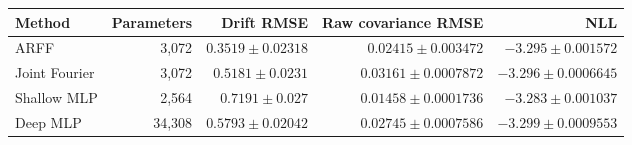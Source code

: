 \begin{tabular}{lrrrr}\toprule Method & Parameters & Drift RMSE & Raw covariance RMSE & NLL\\\midrule
ARFF & 3,072 & $0.3519\pm 0.02318$ & $0.02415\pm 0.003472$ & $-3.295\pm 0.001572$\\
Joint Fourier & 3,072 & $0.5181\pm 0.0231$ & $0.03161\pm 0.0007872$ & $-3.296\pm 0.0006645$\\
Shallow MLP & 2,564 & $0.7191\pm 0.027$ & $0.01458\pm 0.0001736$ & $-3.283\pm 0.001037$\\
Deep MLP & 34,308 & $0.5793\pm 0.02042$ & $0.02745\pm 0.0007586$ & $-3.299\pm 0.0009553$\\
\bottomrule\end{tabular}
